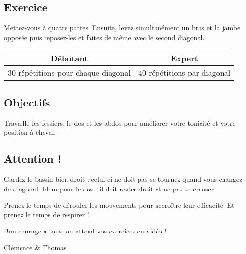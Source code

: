 \documentclass[12pt,a4paper]{article}
\subtitle{Fiche \no 7 -- Quatre pattes dynamique}
\begin{document}
\maketitle




\subsection*{Exercice}
	Mettez-vous à quatre pattes. Ensuite, levez simultanément un bras et la jambe opposée puis reposez-les et faites de même avec le second diagonal.

	\begin{center}
		\begin{tabular}{c|c}
			\textbf{Débutant} & \textbf{Expert} \\
			\hline
			$30$ répétitions pour chaque diagonal & $40$ répétitions par diagonal \\
		\end{tabular}
	\end{center}

\subsection*{Objectifs}
	Travaille les fessiers, le dos et les abdos pour améliorer votre tonicité et votre position à cheval.

\subsection*{Attention !}
	Gardez le bassin bien droit : celui-ci ne doit pas se tournez quand vous changez de diagonal. Idem pour le dos : il doit rester droit et ne pas se creuser.

	Prenez le temps de dérouler les mouvements pour accroître leur efficacité. Et prenez le temps de respirer !

\vfill
\begin{flushright}
	Bon courage à tous, on attend vos exercices en vidéo ! \phantom{Clémence et Thomas}

	Clémence \& Thomas.
\end{flushright}
\end{document}
